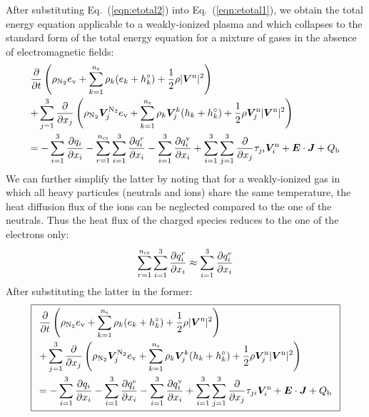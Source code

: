 \documentclass{warpdoc}
\newcommand\frameeqn[1]{\fbox{$\displaystyle #1$}}
\newcommand{\alb}{\vspace{0.1cm}\\} %
\newcommand{\mfd}{\displaystyle}
\newcommand{\ns}{{n_{\rm s}}}
\newcommand{\ncs}{{n_{\rm cs}}}
\newcommand{\ev}{{e_{\rm v}}}
\renewcommand{\vec}[1]{\bm{#1}}
\begin{document}
After substituting Eq.\ (\ref{eqn:etotal2}) into Eq.\ (\ref{eqn:etotal1}), we obtain the total energy equation applicable to a weakly-ionized plasma and which collapses to the standard form of the total energy equation for a mixture of gases in the absence of electromagnetic fields:
%
\begin{equation}
\begin{array}{l}\mfd
 \frac{\partial }{\partial t}\left(\rho_{\rm N_2} \ev+\sum_{k=1}^\ns \rho_k (e_k+h_k^\circ)+\frac{1}{2}\rho|\vec{V}^{\rm n}|^2 \right) \alb\mfd
+ \sum_{j=1}^3  \frac{\partial }{\partial x_j} \left(\rho_{\rm N_2} \vec{V}_j^{\rm N_2} \ev + \sum_{k=1}^\ns \rho_k \vec{V}^k_j (h_k+h_k^\circ)+\frac{1}{2}\rho \vec{V}^{\rm n}_j|\vec{V}^{\rm n}|^2 \right)
 \alb\mfd
=
-\sum_{i=1}^{3}\frac{\partial q_i}{\partial x_i}
- \sum_{r=1}^\ncs \sum_{i=1}^{3}\frac{\partial q_i^r}{\partial x_i}
-\sum_{i=1}^{3}\frac{\partial q_i^{\rm v}}{\partial x_i}
+\sum_{i=1}^3 \sum_{j=1}^3  \frac{\partial }{\partial x_j} \tau_{ji} \vec{V}_i^{\rm n}
+ \vec{E}\cdot\vec{J}
+ Q_{\rm b}
\end{array}
\label{eqn:etotal3}
\end{equation}
%  
We can further simplify the latter by noting that for a weakly-ionized gas in which all heavy particules (neutrals and ions) share the same temperature, the heat diffusion flux  of the ions can be neglected compared to the one of the neutrals. Thus the heat flux of the charged species reduces to the one of the electrons only:
%
\begin{equation}
\sum_{r=1}^\ncs \sum_{i=1}^{3}\frac{\partial q_i^r}{\partial x_i}\approx
 \sum_{i=1}^{3}\frac{\partial q_i^{\rm e}}{\partial x_i}
\end{equation}
%
After substituting the latter in the former:
%
\begin{equation}
\frameeqn{
\begin{array}{l}\mfd
 \frac{\partial }{\partial t}\left(\rho_{\rm N_2} \ev+\sum_{k=1}^\ns \rho_k (e_k+h_k^\circ)+\frac{1}{2}\rho|\vec{V}^{\rm n}|^2 \right) \alb\mfd
+ \sum_{j=1}^3  \frac{\partial }{\partial x_j} \left(\rho_{\rm N_2} \vec{V}_j^{\rm N_2} \ev + \sum_{k=1}^\ns \rho_k \vec{V}^k_j (h_k+h_k^\circ)+\frac{1}{2}\rho \vec{V}^{\rm n}_j|\vec{V}^{\rm n}|^2 \right)
 \alb\mfd
=
-\sum_{i=1}^{3}\frac{\partial q_i}{\partial x_i}
-  \sum_{i=1}^{3}\frac{\partial q_i^{\rm e}}{\partial x_i}
-\sum_{i=1}^{3}\frac{\partial q_i^{\rm v}}{\partial x_i}
+\sum_{i=1}^3 \sum_{j=1}^3  \frac{\partial }{\partial x_j} \tau_{ji} \vec{V}_i^{\rm n}
+ \vec{E}\cdot\vec{J}
+ Q_{\rm b}
\end{array}
}
\label{eqn:etotal4}
\end{equation}
\end{document}

